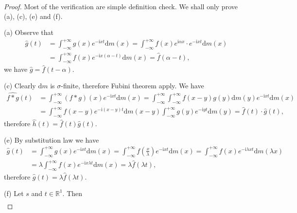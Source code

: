 \begin{proof}
Most of the verification are simple definition check. We shall only prove (a), (c), (e) and (f).\par
(a) Observe that 
$$
\begin{aligned}
\widehat{g}\left( t \right) &=\int_{-\infty}^{+\infty}{g\left( x \right) e^{-\mathrm{i}xt}\mathrm{d}m\left( x \right)}=\int_{-\infty}^{+\infty}{f\left( x \right) e^{\mathrm{i}\alpha x}\cdot e^{-\mathrm{i}xt}\mathrm{d}m\left( x \right)}
\\
&=\int_{-\infty}^{+\infty}{f\left( x \right) e^{-\mathrm{i}x\left( \alpha -t \right)}\mathrm{d}m\left( x \right)}=\widehat{f}\left( \alpha -t \right) ,
\end{aligned}
$$
we have $\widehat{g}=\widehat{f}(t-\alpha)$.\par
(c) Clearly $\mathrm{d}m$ is $\sigma$-finite, therefore Fubini theorem apply. We have 
$$
\begin{aligned}
\widehat{f*g}\left( t \right) &=\int_{-\infty}^{+\infty}{\left( f*g \right) \left( x \right) e^{-\mathrm{i}xt}\mathrm{d}m\left( x \right)}=\int_{-\infty}^{+\infty}{\int_{-\infty}^{+\infty}{f\left( x-y \right) g\left( y \right) \mathrm{d}m\left( y \right)}e^{-\mathrm{i}xt}\mathrm{d}m\left( x \right)}
\\
&=\int_{-\infty}^{+\infty}{f\left( x-y \right) e^{-\mathrm{i}\left( x-y \right) t}\mathrm{d}m\left( x-y \right) \int_{-\infty}^{+\infty}{g\left( y \right) e^{-\mathrm{i}yt}\mathrm{d}m\left( y \right)}}=\widehat{f}\left( t \right) \cdot \widehat{g}\left( t \right) ,
\end{aligned}
$$
therefore $\widehat{h}(t)=\widehat{f}(t)\widehat{g}(t)$.\par
(e) By substitution law we have 
$$
\begin{aligned}
\widehat{g}\left( t \right) &=\int_{-\infty}^{+\infty}{g\left( x \right) e^{-\mathrm{i}xt}\mathrm{d}m\left( x \right)}=\int_{-\infty}^{+\infty}{f\left( \frac{x}{\lambda} \right) e^{-\mathrm{i}xt}\mathrm{d}m\left( x \right)}=\int_{-\infty}^{+\infty}{f\left( x \right) e^{-\mathrm{i}\lambda xt}\mathrm{d}m\left( \lambda x \right)}
\\
&=\lambda \int_{-\infty}^{+\infty}{f\left( x \right) e^{-\mathrm{i}x\lambda t}\mathrm{d}m\left( x \right)}=\lambda \widehat{f}\left( \lambda t \right) ,
\end{aligned}
$$
therefore $\widehat{g}(t)=\lambda\widehat{f}(\lambda t)$.\par
(f) Let $s$ and $t\in\mathbb{R}^1$. Then 
$$
\begin{aligned}

\end{aligned}$$
\end{proof}
